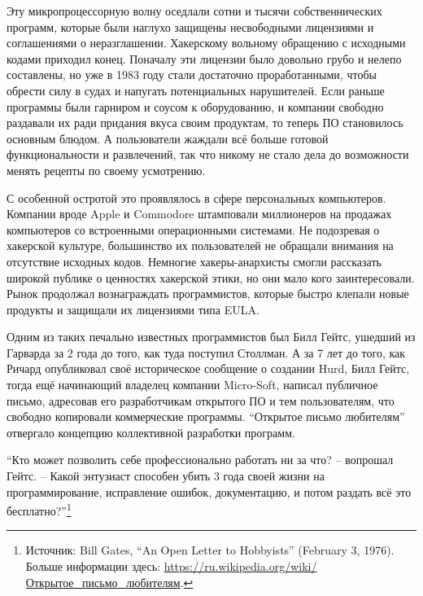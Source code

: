 Эту микропроцессорную волну оседлали сотни и тысячи собственнических программ, которые были наглухо защищены несвободными лицензиями и соглашениями о неразглашении. Хакерскому вольному обращению с исходными кодами приходил конец. Поначалу эти лицензии было довольно грубо и нелепо составлены, но уже в 1983 году стали достаточно проработанными, чтобы обрести силу в судах и напугать потенциальных нарушителей. Если раньше программы были гарниром и соусом к оборудованию, и компании свободно раздавали их ради придания вкуса своим продуктам, то теперь ПО становилось основным блюдом. А пользователи жаждали всё больше готовой функциональности и развлечений, так что никому не стало дела до возможности менять рецепты по своему усмотрению.

С особенной остротой это проявлялось в сфере персональных компьютеров. Компании вроде Apple и Commodore штамповали миллионеров на продажах компьютеров со встроенными операционными системами. Не подозревая о хакерской культуре, большинство их пользователей не обращали внимания на отсутствие исходных кодов. Немногие хакеры-анархисты смогли рассказать широкой публике о ценностях хакерской этики, но они мало кого заинтересовали. Рынок продолжал вознаграждать программистов, которые быстро клепали новые продукты и защищали их лицензиями типа EULA.

Одним из таких печально известных программистов был Билл Гейтс, ушедший из Гарварда за 2 года до того, как туда поступил Столлман. А за 7 лет до того, как Ричард опубликовал своё историческое сообщение о создании Hurd, Билл Гейтс, тогда ещё начинающий владелец компании Micro-Soft, написал публичное письмо, адресовав его разработчикам открытого ПО и тем пользователям, что свободно копировали коммерческие программы. \enquote{Открытое письмо любителям} отвергало концепцию коллективной разработки программ.

\enquote{Кто может позволить себе профессионально работать ни за что? -- вопрошал Гейтс. -- Какой энтузиаст способен убить 3 года своей жизни на программирование, исправление ошибок, документацию, и потом раздать всё это бесплатно?}\footnote{Источник: Bill Gates, \enquote{An Open Letter to Hobbyists} (February 3, 1976). Больше информации здесь: \url{https://ru.wikipedia.org/wiki/Открытое_письмо_любителям}.}

